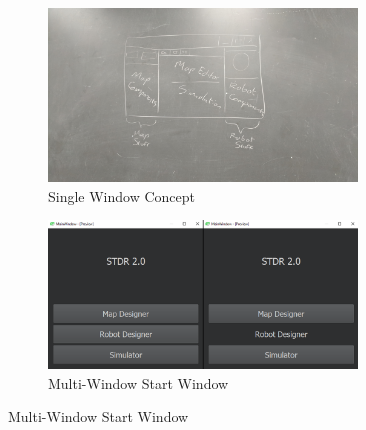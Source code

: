 \begin{figure}
\begin{subfigure}{0.5\textwidth}
	\begin{center}
	\includegraphics[width=0.9\textwidth]{./images_design/Sams.jpg}
	\caption{Single Window Concept}
	\label{fig:singlewindowconcept}
	\end{center}
\end{subfigure}
\begin{subfigure}{0.5\textwidth}
	\begin{center}
	\includegraphics[width=0.9\textwidth]{./images_design/MainScreen.png}
	\caption{Multi-Window Start Window}
	\label{fig:mwindowStart}
	\end{center}
\end{subfigure}


\end{figure}
